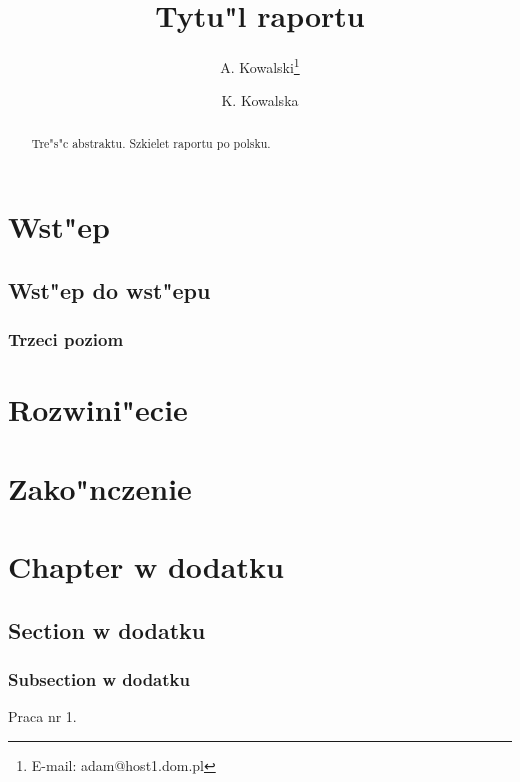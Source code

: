 \documentclass[12pt,a4paper]{report}
\title{Tytu"l raportu}
\author{A. Kowalski\thanks{E-mail: adam@host1.dom.pl}
\and K. Kowalska}
\begin{document}
\maketitle

\begin{abstract}
Tre"s"c abstraktu.
Szkielet raportu po polsku.
\end{abstract}

\chapter{Wst"ep}

\section{Wst"ep do wst"epu}

\subsection{Trzeci poziom}

\chapter{Rozwini"ecie}

\chapter{Zako"nczenie}

\appendix

\chapter{Chapter w dodatku}

\section{Section w dodatku}

\subsection{Subsection w dodatku}


\begin{thebibliography}{99}

Praca nr 1.

\end{thebibliography}
\end{document}
